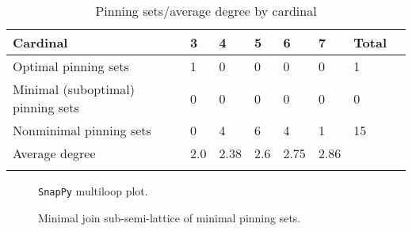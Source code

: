 \documentclass{article}%
\begin{document}
\begin{table}[ht]
	\caption{Pinning sets/average degree by cardinal}
	\centering
	\renewcommand{\arraystretch}{1.5}
	\begin{tabularx}{\textwidth}{lXXXXXXX}
		\toprule
			Cardinal & 3 & 4 & 5 & 6 & 7 & Total\\
			\hline
			Optimal pinning sets & 1 & 0 & 0 & 0 & 0 & 1 \\
			Minimal (suboptimal) pinning sets & 0 & 0 & 0 & 0 & 0 & 0 \\
			Nonminimal pinning sets & 0 & 4 & 6 & 4 & 1 & 15 \\
			Average degree & 2.0 & 2.38 & 2.6 & 2.75 & 2.86 &  \\
		\bottomrule \\ 
	\end{tabularx}
\end{table}

\begin{multicols}{2}
\begin{figure}[H]
\centering

\caption{\texttt{SnapPy} multiloop plot.}
\label{fig:tex/img/[[5, 10, 6, 1], [9, 4, 10, 5], [6, 4, 7, 3], [1, 8, 2, 9], [7, 2, 8, 3]].svg}
\end{figure}
\columnbreak

\begin{figure}[H]
\centering
\scalebox{0.8}{}
\caption{Minimal join sub-semi-lattice of minimal pinning sets.}
\label{fig:tex/img/[[5, 10, 6, 1], [9, 4, 10, 5], [6, 4, 7, 3], [1, 8, 2, 9], [7, 2, 8, 3]].pgf}
\end{figure}
\end{multicols}

\newpage
\end{document}

